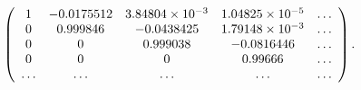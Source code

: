 \begin{equation}
\label{eq:pure.scalar.eigenvectors}
\left(
\begin{array}{c c c c c}
1&
-0.0175512&
3.84804\times 10^{-3}&
1.04825\times 10^{-5}&
\ldots\\
0&
0.999846&
-0.0438425&
1.79148\times 10^{-3}&
\ldots\\
0&
0&
0.999038&
-0.0816446&
\ldots\\
0&
0&
0&
0.99666&
\ldots\cr
\ldots&\ldots&\ldots&\ldots&\ldots
\end{array}
\right).
\end{equation}

